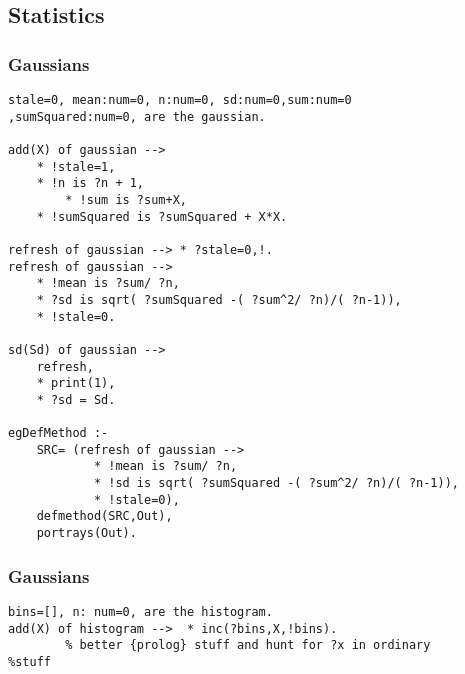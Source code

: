 \documentclass[twocolumn,10pt]{book}
\begin{document}
\subsection{ Statistics
}
\subsubsection{ Gaussians }\begin{Verbatim}
stale=0, mean:num=0, n:num=0, sd:num=0,sum:num=0
,sumSquared:num=0, are the gaussian.

add(X) of gaussian -->
    * !stale=1,
    * !n is ?n + 1,
        * !sum is ?sum+X,
    * !sumSquared is ?sumSquared + X*X.

refresh of gaussian --> * ?stale=0,!.
refresh of gaussian -->
    * !mean is ?sum/ ?n,
    * ?sd is sqrt( ?sumSquared -( ?sum^2/ ?n)/( ?n-1)),
    * !stale=0.

sd(Sd) of gaussian -->
    refresh,
    * print(1),
    * ?sd = Sd.

egDefMethod :-
    SRC= (refresh of gaussian -->
            * !mean is ?sum/ ?n,
            * !sd is sqrt( ?sumSquared -( ?sum^2/ ?n)/( ?n-1)),
            * !stale=0),
    defmethod(SRC,Out),
    portrays(Out).
\end{Verbatim}
\subsubsection{ Gaussians }\begin{Verbatim}
bins=[], n: num=0, are the histogram.
add(X) of histogram -->  * inc(?bins,X,!bins).
        % better {prolog} stuff and hunt for ?x in ordinary
%stuff
\end{Verbatim}
\end{document}
